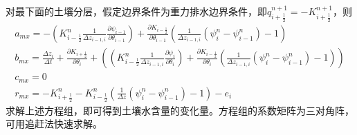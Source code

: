 对最下面的土壤分层，假定边界条件为重力排水边界条件，即$q_{i+\frac{1}{2}}^{n+1}=-K_{i+\frac{1}{2}}^{n+1}$，则
\begin{equation}
\begin{array}{c}{a}_{{mx}}=-\left(K_{i-\frac{1}{2}}^{n} \frac{1}{\Delta z_{i-1, i}} \frac{\partial \psi_{i-1}}
    {\partial \theta_{i-1}}\right)+\frac{\partial K_{i-\frac{1}{2}}}{\partial \theta_{i-1}}\left(\frac{1}{\Delta z_{i-1, i}}
    \left(\psi_{i}^{n}-\psi_{i-1}^{n}\right)-1\right) \\ {b}_{{mx}}=\frac{\Delta z_{i}}{\Delta t}+\frac{\partial K_{i+\frac{1}{2}}}
    {\partial \theta_{i}}+\left(\left(K_{i-\frac{1}{2}}^{n} \frac{1}{\Delta z_{i-1, i}} \frac{\partial \psi_{i}}{\partial \theta_{i}}\right)+
    \frac{\partial K_{i-\frac{1}{2}}}{\partial \theta_{i}}\left(\frac{1}{\Delta z_{i-1, i}}\left(\psi_{i}^{n}-\psi_{i-1}^{n}\right)-1\right)\right) \\
     c_{{mx}}=0 \\ r_{m x}=-K_{i+\frac{1}{2}}^{n}-K_{i-\frac{1}{2}}^{n}\left(\frac{1}{\Delta z}\left(\psi_{i}^{n}-\psi_{i-1}^{n}\right)-1\right)-e_{i}\end{array}
\end{equation}
求解上述方程组，即可得到土壤水含量的变化量。方程组的系数矩阵为三对角阵，可用追赶法快速求解。


